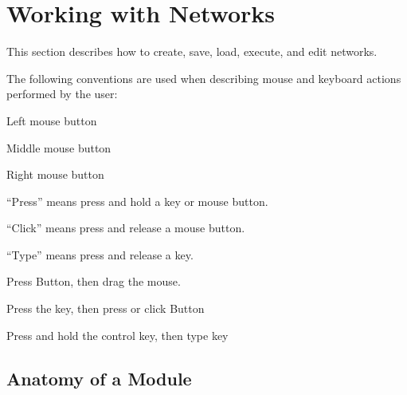 %
%
%
%
%

\chapter{Working with Networks}
\label{ch:workwithnets}

This section describes how to create, save, load, execute, and edit
networks.

The following conventions are used when describing mouse and keyboard
actions performed by the user:

\begin{description}
 Left mouse button

 Middle mouse button

 Right mouse button

 ``Press'' means press and hold a key or mouse button.

 ``Click'' means press and release a mouse button.

 ``Type''  means press and release a key.

 Press Button,
then drag the mouse.

 Press the  key,
then press or click Button

 Press and hold the control key, then
type key 
\end{description}


\section{Anatomy of a Module}
\label{sec:modanatomy}

  \newcommand{\modgraphic}%
  {\centerline{\epsfig{file=Figures/modgraphic-1.eps.gz,width=4in,
        bbllx=0, bblly=0, bburx=325, bbury=157}}}
\begin{htmlonly}
  \newcommand{\modgraphic}{%
  \htmladdimg[align=top,width="256",alt="SCIRun Module Graphic"]
  {../Figures/modgraphic-1.gif}}
\end{htmlonly}

